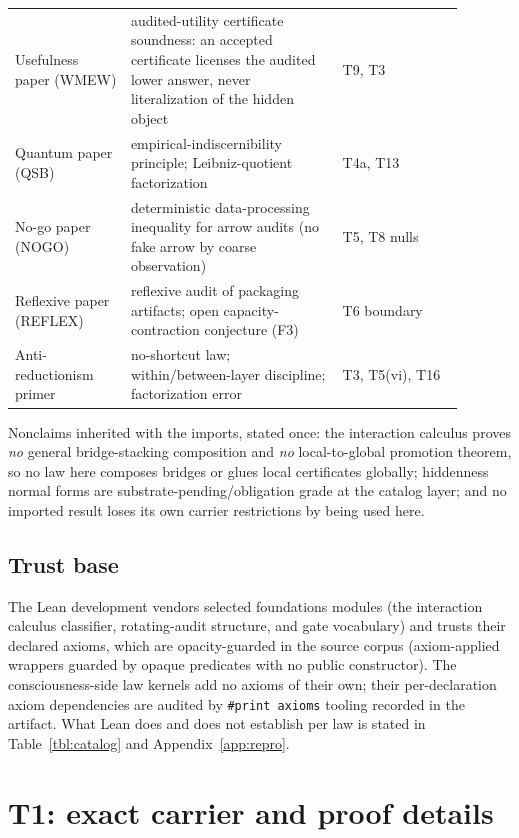 \documentclass[11pt]{article}
\theoremstyle{definition}
\begin{document}
\begin{center}
\begin{tabular}{p{0.23\linewidth}p{0.42\linewidth}p{0.24\linewidth}}
Usefulness paper (WMEW) & audited-utility certificate soundness: an accepted certificate licenses the audited lower answer, never literalization of the hidden object & T9, T3 \\
Quantum paper (QSB) & empirical-indiscernibility principle; Leibniz-quotient factorization & T4a, T13 \\
No-go paper (NOGO) & deterministic data-processing inequality for arrow audits (no fake arrow by coarse observation) & T5, T8 nulls \\
Reflexive paper (REFLEX) & reflexive audit of packaging artifacts; open capacity-contraction conjecture (F3) & T6 boundary \\
Anti-reductionism primer & no-shortcut law; within/between-layer discipline; factorization error & T3, T5(vi), T16 \\
\bottomrule
\end{tabular}
\end{center}

Nonclaims inherited with the imports, stated once: the interaction calculus
proves \emph{no} general bridge-stacking composition and \emph{no}
local-to-global promotion theorem, so no law here composes bridges or glues
local certificates globally; hiddenness normal forms are
substrate-pending/obligation grade at the catalog layer; and no imported
result loses its own carrier restrictions by being used here.

\subsection{Trust base}

The Lean development vendors selected foundations modules (the interaction
calculus classifier, rotating-audit structure, and gate vocabulary) and
trusts their declared axioms, which are opacity-guarded in the source corpus
(axiom-applied wrappers guarded by opaque predicates with no public
constructor). The consciousness-side law kernels add no axioms of their own;
their per-declaration axiom dependencies are audited by
\texttt{\#print axioms} tooling recorded in the artifact. What Lean does and
does not establish per law is stated in Table~\ref{tbl:catalog} and
Appendix~\ref{app:repro}.

 \section{T1: exact carrier and proof details}
\label{app:t1}
\end{document}
